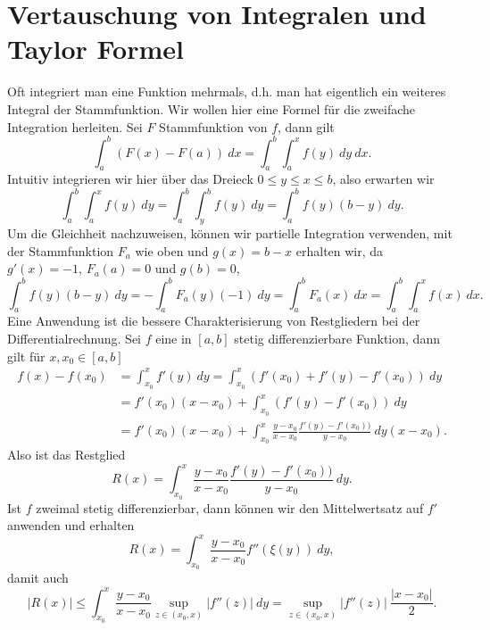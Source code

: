 \section{Vertauschung von Integralen und Taylor Formel}
\label{\detokenize{integration/vertauschen:vertauschung-von-integralen-und-taylor-formel}}\label{\detokenize{integration/vertauschen::doc}}
Oft integriert man eine Funktion mehrmals, d.h. man hat eigentlich ein weiteres Integral der Stammfunktion. Wir wollen hier eine Formel für die zweifache Integration herleiten. Sei \(F\) Stammfunktion von \(f\), dann gilt
\begin{equation*}
 \int_a^b (F(x) - F(a))~dx = \int_a^b \int_a^x f(y)~dy~dx.
\end{equation*}
Intuitiv integrieren wir hier über das Dreieck \(0 \leq y \leq x \leq b\), also erwarten wir
\begin{equation*}
 \int_a^b \int_a^x f(y)~dy = \int_a^b \int_y^b f(y)~dy = \int_a^b f(y) (b-y)~dy.
\end{equation*}
Um die Gleichheit nachzuweisen, können wir partielle Integration verwenden, mit der Stammfunktion \(F_a\) wie oben und \(g(x) = b-x\) erhalten wir, da \(g'(x)=-1\), \(F_a(a) = 0 \) und \(g(b) =0\),
\begin{equation*}
 \int_a^b f(y) (b-y)~dy = - \int_a^b F_a(y) (-1)~dy = \int_a^b F_a(x)~dx =  \int_a^b \int_a^x f(x)~dx .
\end{equation*}
Eine Anwendung ist die bessere Charakterisierung von Restgliedern bei der Differentialrechnung. Sei \(f\) eine in \([a,b]\) stetig differenzierbare Funktion, dann gilt für \(x,x_0 \in [a,b]\)
\begin{align*}
f(x) - f(x_0) &= \int_{x_0}^x f'(y)~dy =  \int_{x_0}^x (f'(x_0) + f'(y) -f'(x_0))~dy \\
&= f'(x_0) (x-x_0) + \int_{x_0}^x ( f'(y) -f'(x_0))~dy \\&= f'(x_0) (x-x_0) + \int_{x_0}^x \frac{y-x_0}{x-x_0} \frac{ f'(y) -f'(x_0))}{y-x_0}~dy  (x-x_0) .
\end{align*}
Also ist das Restglied
\begin{equation*}
R(x) = \int_{x_0}^x \frac{y-x_0}{x-x_0} \frac{ f'(y) -f'(x_0))}{y-x_0}~dy .
\end{equation*}
Ist \(f\) zweimal stetig differenzierbar, dann können wir den Mittelwertsatz auf \(f'\) anwenden und erhalten
\begin{equation*}
 R(x) = \int_{x_0}^x \frac{y-x_0}{x-x_0} f''(\xi(y))~dy,
\end{equation*}
damit auch
\begin{equation*}
 |R(x)| \leq  \int_{x_0}^x \frac{y-x_0}{x-x_0} \sup_{z \in (x_0,x)} |f''(z)|~dy = \sup_{z \in (x_0,x)} |f''(z)| ~ \frac{|x-x_0|}2.
\end{equation*}





\renewcommand{\indexname}{Proof Index}


\renewcommand{\indexname}{Index}

